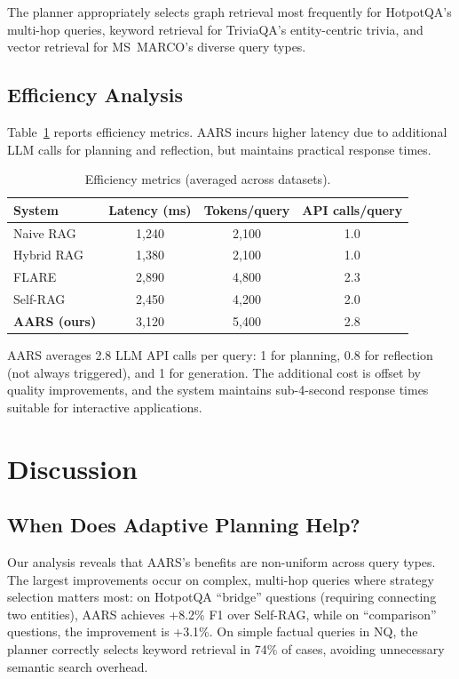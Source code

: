 \documentclass[runningheads]{llncs}
\begin{document}
The planner appropriately selects graph retrieval most frequently for HotpotQA's multi-hop queries, keyword retrieval for TriviaQA's entity-centric trivia, and vector retrieval for MS~MARCO's diverse query types.

\subsection{Efficiency Analysis}

Table~\ref{tab:efficiency} reports efficiency metrics. AARS incurs higher latency due to additional LLM calls for planning and reflection, but maintains practical response times.

\begin{table}[t]
\centering
\caption{Efficiency metrics (averaged across datasets).}
\label{tab:efficiency}
\begin{tabular}{lccc}
\toprule
\textbf{System} & \textbf{Latency (ms)} & \textbf{Tokens/query} & \textbf{API calls/query} \\
\midrule
Naive RAG & 1,240 & 2,100 & 1.0 \\
Hybrid RAG & 1,380 & 2,100 & 1.0 \\
FLARE & 2,890 & 4,800 & 2.3 \\
Self-RAG & 2,450 & 4,200 & 2.0 \\
\textbf{AARS (ours)} & 3,120 & 5,400 & 2.8 \\
\bottomrule
\end{tabular}
\end{table}

AARS averages 2.8 LLM API calls per query: 1 for planning, 0.8 for reflection (not always triggered), and 1 for generation. The additional cost is offset by quality improvements, and the system maintains sub-4-second response times suitable for interactive applications.

\section{Discussion}
\label{sec:discussion}

\subsection{When Does Adaptive Planning Help?}

Our analysis reveals that AARS's benefits are non-uniform across query types. The largest improvements occur on complex, multi-hop queries where strategy selection matters most: on HotpotQA ``bridge'' questions (requiring connecting two entities), AARS achieves +8.2\% F1 over Self-RAG, while on ``comparison'' questions, the improvement is +3.1\%. On simple factual queries in NQ, the planner correctly selects keyword retrieval in 74\% of cases, avoiding unnecessary semantic search overhead.
\end{document}
